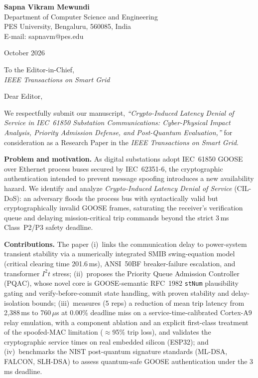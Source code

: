 \documentclass[11pt]{article}
\begin{document}
\noindent\textbf{Sapna Vikram Mewundi} \\
Department of Computer Science and Engineering \\
PES University, Bengaluru, 560085, India \\
E-mail: sapnavm@pes.edu

\vspace{4pt}
 October 2026

\vspace{10pt}
\noindent To the Editor-in-Chief, \\
\textit{IEEE Transactions on Smart Grid}

\vspace{10pt}
\noindent Dear Editor,

\vspace{6pt}
We respectfully submit our manuscript, \textit{``Crypto-Induced Latency Denial of Service in IEC~61850 Substation Communications: Cyber-Physical Impact Analysis, Priority Admission Defense, and Post-Quantum Evaluation,''} for consideration as a Research Paper in the \textit{IEEE Transactions on Smart Grid}.

\textbf{Problem and motivation.} As digital substations adopt IEC~61850 GOOSE over Ethernet process buses secured by IEC~62351-6, the cryptographic authentication intended to prevent message spoofing introduces a new availability hazard. We identify and analyze \textit{Crypto-Induced Latency Denial of Service} (CIL-DoS): an adversary floods the process bus with syntactically valid but cryptographically invalid GOOSE frames, saturating the receiver's verification queue and delaying mission-critical trip commands beyond the strict 3\,ms Class~P2/P3 safety deadline.

\textbf{Contributions.} The paper (i)~links the communication delay to power-system transient stability via a numerically integrated SMIB swing-equation model (critical clearing time 201.6\,ms), ANSI~50BF breaker-failure escalation, and transformer $I^2t$ stress; (ii)~proposes the Priority Queue Admission Controller (PQAC), whose novel core is GOOSE-semantic RFC~1982 \texttt{stNum} plausibility gating and verify-before-commit state handling, with proven stability and delay-isolation bounds; (iii)~measures (5 reps) a reduction of mean trip latency from 2{,}388\,ms to 760\,$\mu$s at 0.00\% deadline miss on a service-time-calibrated Cortex-A9 relay emulation, with a component ablation and an explicit first-class treatment of the spoofed-MAC limitation ($\approx$95\% trip loss), and validates the cryptographic service times on real embedded silicon (ESP32); and (iv)~benchmarks the NIST post-quantum signature standards (ML-DSA, FALCON, SLH-DSA) to assess quantum-safe GOOSE authentication under the 3\,ms deadline.
\end{document}
